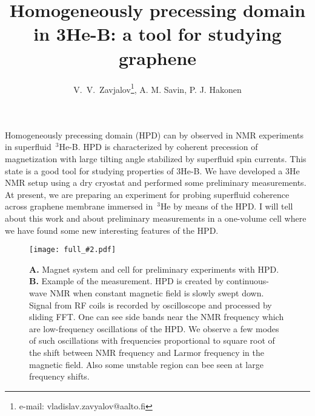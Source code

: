 \documentclass[a4paper]{article}
\newcommand{\image}[3]{
\begin{figure}[#1]
\begin{center}
\texttt{[image: full\_\#2.pdf]}
\caption{\small#3}
\label{image:#2}
\end{center}
\end{figure}
}
\begin{document}
\title{Homogeneously precessing domain in 3He-B: a tool for studying graphene}
\author{V.~V.~Zavjalov\/\thanks{e-mail: vladislav.zavyalov@aalto.fi},  A. M. Savin, P. J. Hakonen}
\maketitle

Homogeneously precessing domain (HPD) can by observed in NMR experiments
in superfluid~$^3$He-B. HPD is characterized by coherent precession of
magnetization with large tilting angle stabilized by superfluid spin
currents. This state is a good tool for studying properties of 3He-B. We
have developed a 3He NMR setup using a dry cryostat and performed some
preliminary measurements. At present, we are preparing an experiment for
probing superfluid coherence across graphene membrane immersed in~$^3$He
by means of the HPD. I will tell about this work and about preliminary
measurements in a one-volume cell where we have found some new
interesting features of the HPD.

\image{h!}{abstr_image}{
{\bf A.} Magnet system and cell for preliminary experiments with HPD.
{\bf B.} Example of the measurement. HPD is created by continuous-wave
NMR when constant magnetic field is slowly swept down. Signal from RF
coils is recorded by oscilloscope and processed by sliding FFT. One can
see side bands near the NMR frequency which are low-frequency
oscillations of the HPD. We observe a few modes of such oscillations with
frequencies proportional to square root of the shift between NMR
frequency and Larmor frequency in the magnetic field. Also some unstable
region can bee seen at large frequency shifts. }
\end{document}
